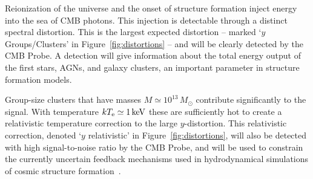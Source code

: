 Reionization of the universe and the onset of structure formation inject
energy into the sea of CMB photons. This injection is detectable through a distinct spectral distortion. 
This is the largest expected distortion -- marked `$y$ Groups/Clusters' in Figure~\ref{fig:distortions} --
and will be clearly detected by the CMB Probe. 
A detection will give information about the total energy output of the first stars, AGNs, and galaxy clusters, 
an important parameter in structure formation models. 

Group-size clusters that have masses $M\simeq 10^{13}\,M_{\odot}$ contribute significantly to the signal. 
With temperature $k T_{\rm e}\simeq 1\,{\rm keV}$ these are sufficiently hot to create a relativistic 
temperature correction to the large $y$-distortion. This relativistic correction, denoted `$y$ relativistic' in 
Figure~\ref{fig:distortions},  will also be detected with high signal-to-noise ratio by the CMB Probe, and 
will be used to constrain the currently uncertain feedback mechanisms used in hydrodynamical simulations
of cosmic structure formation~\citep{Hill2015}. 



